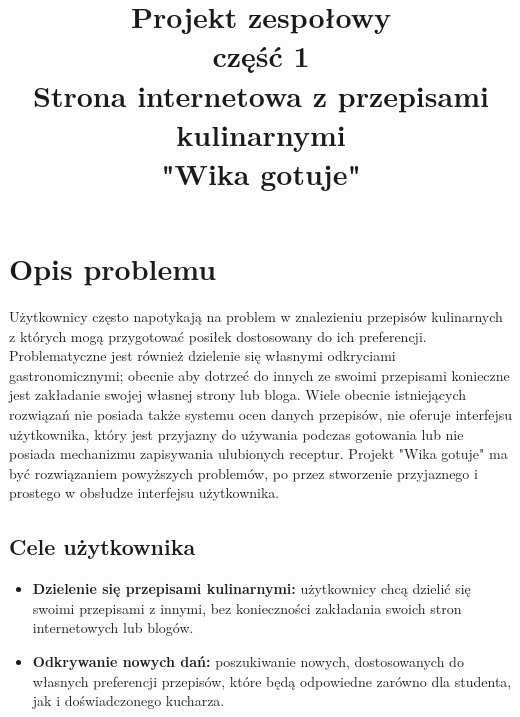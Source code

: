 \documentclass{article}
\title{\fontsize{20}{22}\selectfont Projekt zespołowy\\ część 1\\Strona internetowa z przepisami kulinarnymi\\"Wika gotuje"}
\date{}
\begin{document}
\maketitle
\newpage
\tableofcontents
\newpage

\section{Opis problemu}
\noindent
Użytkownicy często napotykają na problem w znalezieniu przepisów kulinarnych z których mogą przygotować posiłek dostosowany do ich preferencji. Problematyczne jest również dzielenie
się własnymi odkryciami gastronomicznymi; obecnie aby dotrzeć do innych ze swoimi przepisami konieczne jest zakładanie swojej własnej strony lub bloga. Wiele obecnie istniejących
rozwiązań nie posiada także systemu ocen danych przepisów, nie oferuje interfejsu użytkownika, który jest przyjazny do używania podczas gotowania lub nie posiada mechanizmu zapisywania
ulubionych receptur. Projekt "Wika gotuje" ma być rozwiązaniem powyższych problemów, po przez stworzenie przyjaznego i prostego w obsłudze interfejsu użytkownika.

\subsection{Cele użytkownika}
\begin{itemize}
    \item \textbf{Dzielenie się przepisami kulinarnymi:} użytkownicy chcą dzielić się swoimi przepisami z innymi, bez konieczności zakładania swoich stron internetowych lub blogów.
    \item \textbf{Odkrywanie nowych dań:} poszukiwanie nowych, dostosowanych do własnych preferencji przepisów, które będą odpowiedne zarówno dla studenta, jak i doświadczonego kucharza.
\end{itemize}
\end{document}
